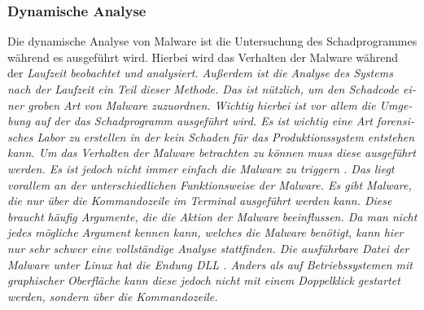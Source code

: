 \begin{otherlanguage}{ngerman}
\subsubsection{Dynamische Analyse}
Die dynamische Analyse von Malware ist die Untersuchung des Schadprogrammes während es ausgeführt wird. Hierbei wird das Verhalten der Malware während der \it Laufzeit \rm beobachtet und analysiert. Außerdem ist die Analyse des Systems nach der Laufzeit ein Teil dieser Methode. Das ist nützlich, um den Schadcode einer groben Art von Malware zuzuordnen. Wichtig hierbei ist vor allem die Umgebung auf der das Schadprogramm ausgeführt wird. Es ist wichtig eine Art \it forensisches Labor \rm zu erstellen in der kein Schaden für das Produktionssystem entstehen kann. 
\newline
Um das Verhalten der Malware betrachten zu können muss diese ausgeführt werden. Es ist jedoch nicht immer einfach die Malware zu \it triggern \rm. Das liegt vorallem an der unterschiedlichen Funktionsweise der Malware. Es gibt Malware, die nur über die Kommandozeile im Terminal ausgeführt werden kann. Diese braucht häufig Argumente, die die Aktion der Malware beeinflussen. Da man nicht jedes mögliche Argument kennen kann, welches die Malware benötigt, kann hier nur sehr schwer eine vollständige Analyse stattfinden. 
\newline
Die ausführbare Datei der Malware unter Linux hat die Endung \dq DLL \dq. Anders als auf Betriebssystemen mit graphischer Oberfläche kann diese jedoch nicht mit einem Doppelklick gestartet werden, sondern über die Kommandozeile. 


\end{otherlanguage}